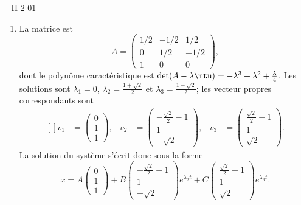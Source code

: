 \begin{corrige}{_II-2-01}
\begin{enumerate}
\item
La matrice est
\begin{equation}
	A=\begin{pmatrix}
  1/2	&	-1/2	&	1/2\\ 
  0	&	1/2	&	-1/2\\ 
 1	&	0	& 0	  
\end{pmatrix},
\end{equation}
dont le polynôme caractéristique est $\det(A-\lambda\mtu)=-\lambda^3+\lambda^2+\frac{ \lambda }{ 4 }$. Les solutions sont $\lambda_1=0$, $\lambda_2=\frac{ 1+\sqrt{2} }{2}$ et $\lambda_3=\frac{ 1-\sqrt{2} }{2}$; les vecteur propres correspondants sont
\begin{equation}
	\begin{aligned}[]
		v_1&=\begin{pmatrix}
	0	\\ 
	1	\\ 
	1	
\end{pmatrix},&v_2&=\begin{pmatrix}
	-\frac{ \sqrt{2} }{ 2 }-1	\\ 
	1	\\ 
	-\sqrt{2}	
\end{pmatrix},&v_3&=\begin{pmatrix}
	\frac{ \sqrt{2} }{2}-1	\\ 
	1	\\ 
	\sqrt{2}	
\end{pmatrix}.
	\end{aligned}
\end{equation}
La solution du système s'écrit donc sous la forme
\begin{equation}
	\bar x=A
		\begin{pmatrix}
	0	\\ 
	1	\\ 
	1	
\end{pmatrix}+B\begin{pmatrix}
	-\frac{ \sqrt{2} }{ 2 }-1	\\ 
	1	\\ 
	-\sqrt{2}	
\end{pmatrix} e^{\lambda_2t}+C\begin{pmatrix}
	\frac{ \sqrt{2} }{2}-1	\\ 
	1	\\ 
	\sqrt{2}	
\end{pmatrix} e^{\lambda_3t}.
\end{equation}


\end{enumerate}
\end{corrige}
